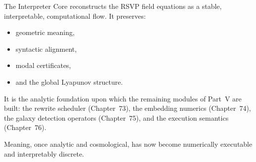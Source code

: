 The Interpreter Core reconstructs the RSVP field equations as a
stable, interpretable, computational flow.
It preserves:
\begin{itemize}
\item geometric meaning,
\item syntactic alignment,
\item modal certificates,
\item and the global Lyapunov structure.
\end{itemize}

It is the analytic foundation upon which the remaining modules of
Part~V are built:
the rewrite scheduler (Chapter~73),
the embedding numerics (Chapter~74),
the galaxy detection operators (Chapter~75),
and the execution semantics (Chapter~76).

Meaning, once analytic and cosmological,
has now become numerically executable and interpretably discrete.

